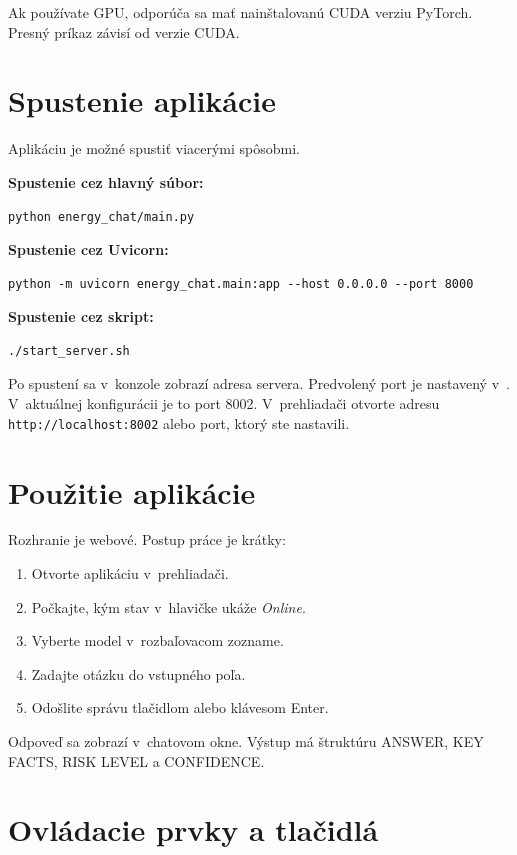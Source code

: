 Ak používate GPU, odporúča sa mať nainštalovanú CUDA verziu PyTorch. Presný príkaz závisí od verzie CUDA.

\section{Spustenie aplikácie}

Aplikáciu je možné spustiť viacerými spôsobmi.

\textbf{Spustenie cez hlavný súbor:}
\begin{verbatim}
python energy_chat/main.py
\end{verbatim}

\textbf{Spustenie cez Uvicorn:}
\begin{verbatim}
python -m uvicorn energy_chat.main:app --host 0.0.0.0 --port 8000
\end{verbatim}

\textbf{Spustenie cez skript:}
\begin{verbatim}
./start_server.sh
\end{verbatim}

Po spustení sa v~konzole zobrazí adresa servera. Predvolený port je nastavený v~. V~aktuálnej konfigurácii je to port 8002. V~prehliadači otvorte adresu \texttt{http://localhost:8002} alebo port, ktorý ste nastavili.

\section{Použitie aplikácie}

Rozhranie je webové. Postup práce je krátky:
\begin{enumerate}
	\item Otvorte aplikáciu v~prehliadači.
	\item Počkajte, kým stav v~hlavičke ukáže \emph{Online}.
	\item Vyberte model v~rozbaľovacom zozname.
	\item Zadajte otázku do vstupného poľa.
	\item Odošlite správu tlačidlom alebo klávesom Enter.
\end{enumerate}

Odpoveď sa zobrazí v~chatovom okne. Výstup má štruktúru ANSWER, KEY FACTS, RISK LEVEL a CONFIDENCE.

\section{Ovládacie prvky a tlačidlá}

